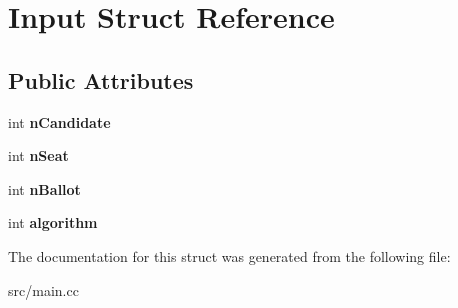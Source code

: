 \hypertarget{structInput}{}\section{Input Struct Reference}
\label{structInput}
\subsection*{Public Attributes}
\begin{DoxyCompactItemize}
\item 
int {\bfseries n\+Candidate}\hypertarget{structInput_a8f574570e68aa71f0b812c33df9ba8ec}{}\label{structInput_a8f574570e68aa71f0b812c33df9ba8ec}

\item 
int {\bfseries n\+Seat}\hypertarget{structInput_a9acc4574844c0d22aaaeab50d435dfdd}{}\label{structInput_a9acc4574844c0d22aaaeab50d435dfdd}

\item 
int {\bfseries n\+Ballot}\hypertarget{structInput_a22f320bce7b5fe2a8530a7425481d4ce}{}\label{structInput_a22f320bce7b5fe2a8530a7425481d4ce}

\item 
int {\bfseries algorithm}\hypertarget{structInput_abc257f67adb5eab0d9c62ac5f2611916}{}\label{structInput_abc257f67adb5eab0d9c62ac5f2611916}

\end{DoxyCompactItemize}


The documentation for this struct was generated from the following file\+:\begin{DoxyCompactItemize}
\item 
src/main.\+cc\end{DoxyCompactItemize}
